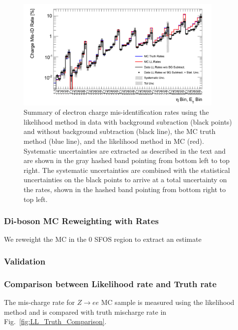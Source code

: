 \begin{figure}[htp]
\centering
\includegraphics[width=0.9\textwidth]{figures/ChargeMisID/Validation_ChargeMisIDRates_PTvsEta_FinalRateWithSys.png}
\caption{Summary of electron charge mis-identification rates using
the likelihood method in data with background subraction (black points) 
and without background subtraction (black line), the MC truth 
method (blue line), and the likelihood method in MC (red).
Systematic uncertainties are extracted as described in the text and are shown
in the gray hashed band pointing from bottom left to top right. 
The systematic uncertainties are combined with the statistical uncertainties
on the black points to arrive at a total uncertainty on the rates, shown 
in the hashed band pointing from bottom right to top left.}
\label{fig:ChargeMisID_truthRate_finalFig}
\end{figure}




\subsubsection{Di-boson MC Reweighting with Rates}

We reweight the MC in the 0 SFOS region to extract an estimate

\subsubsection{Validation}


\subsubsection{Comparison between Likelihood rate and Truth rate}
   The mis-charge rate for $Z\rightarrow ee$ MC sample is measured
   using the likelihood method and is compared with truth mischarge
   rate in Fig.~\ref{fig:LL_Truth_Comparison}.

